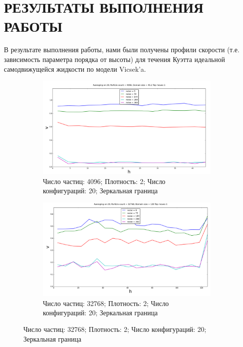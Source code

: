 \chapter{РЕЗУЛЬТАТЫ ВЫПОЛНЕНИЯ РАБОТЫ}
\label{ch:Results}

В результате выполнения работы, нами были получены профили скорости (т.е. зависимость параметра порядка от высоты) для течения Куэтта идеальной самодвижущейся жидкости по модели Vicsek'a.

\begin{figure}
    \centering
        \begin{subfigure}{\textwidth}
        \centering
            \includegraphics[height=0.3\textheight]{Images/4k_x20}
            \caption{Число частиц: 4096; Плотность: 2; Число конфигураций: 20; Зеркальная граница}
            \label{fig:Results:32k}
        \end{subfigure}
        \begin{subfigure}{\textwidth}
        \centering
            \includegraphics[height=0.3\textheight]{Images/32k_x20}
            \caption{Число частиц: 32768; Плотность: 2; Число конфигураций: 20; Зеркальная граница}

\end{subfigure}
\end{figure}
